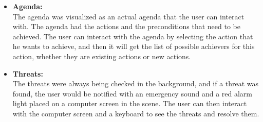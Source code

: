 \begin{itemize}
    \item \textbf{Agenda:} \\
          The agenda was visualized as an actual agenda that the user can interact with. The agenda had the actions and the preconditions that need to be achieved. The user can interact with the agenda by selecting the action that he wants to achieve, and then it will get the list of possible achievers for this action, whether they are existing actions or new actions.

    \item \textbf{Threats:} \\
          The threats were always being checked in the background, and if a threat was found, the user would be notified with an emergency sound and a red alarm\cite{3DAlarmLight} light placed on a computer screen in the scene. The user can then interact with the computer screen and a keyboard to see the threats and resolve them.


\end{itemize}
